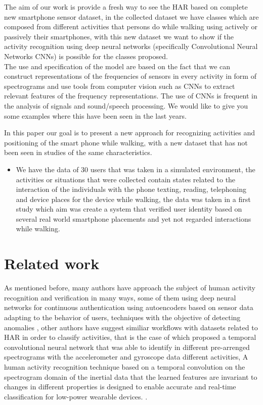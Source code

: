 \documentclass[10pt,halfline,a4paper]{ouparticle}
\begin{document}
\noindent
The aim of our work is provide a fresh way to see the HAR based on complete new smartphone sensor dataset, in the collected dataset we have classes which are composed from different activities that persons do while walking using actively or passively their smartphones, with this new dataset we want to show if the activity recognition using deep neural networks (specifically Convolutional Neural Networks CNNs) is possible for the classes proposed.\\

\noindent
The use and specification of the model are based on the fact that we can construct representations of the frequencies of sensors in every activity in form of spectrograms and use tools from computer vision such as CNNs to extract relevant features of the frequency representations. The use of CNNs is frequent in the analysis of signals and sound/speech processing. We would like to give you some examples where this have been seen in the last years.

\noindent
In this paper our goal is to present a new approach for recognizing activities and positioning of the smart phone while walking, with a new dataset that has not been seen in studies of the same characteristics. 
\begin{itemize}
	\item We have the data of 30 users that was taken in a simulated environment, the activities or situations that were collected contain states related to the interaction of the individuals with the phone texting, reading, telephoning and device places for the device while walking, the data was taken in a first study \cite{Klieme} which aim was create a system that verified user identity based on several real world smartphone placements and yet not regarded interactions while walking. 
\end{itemize}


\section{Related work}

As mentioned before, many authors have approach the subject of human activity recognition and verification in many ways, some of them using deep neural networks for continuous authentication using autoencoders based on sensor data adapting to the behavior of users, techniques with the objective of detecting anomalies \cite{Parreno}, other authors have suggest similiar workflows with datasets related to HAR in order to classify activities, that is the case of \cite{Ravi} which proposed a temporal convolutional neural network that was able to identify in different pre-arrenged spectrograms with the accelerometer and gyroscope data different activities, A human activity recognition technique based on a temporal convolution on the spectrogram domain of the inertial data that the learned features are invariant to changes in different properties is designed to enable accurate and real-time classification for low-power wearable devices.
 \cite{Ravi}. \\
\end{document}
